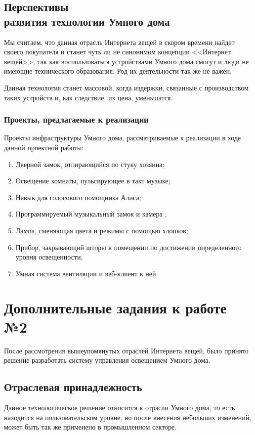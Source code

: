 \documentclass[a4paper,14pt]{extarticle}
\begin{document}
\fi
\subsection{Перспективы\\развития технологии Умного дома}
Мы считаем, что данная отрасль Интернета вещей в скором времени найдет своего покупателя и станет чуть ли не синонимом концепции <<Интернет вещей>>, так как воспользоваться устройствами Умного дома смогут и люди не имеющие технического образования. Род их деятельности так же не важен.

Данная технология станет массовой, когда издержки, связанные с производством таких устройств и, как следствие, их цена, уменьшатся.
\subsubsection*{Проекты, предлагаемые к реализации}
Проекты инфраструктуры Умного дома, рассматриваемые к реализации в ходе данной проектной работы:
\begin{enumerate}
	\item Дверной замок, отпирающийся по стуку хозяина;
	\item Освещение комнаты, пульсирующее в такт музыке;
	\item Навык для голосового помощника Алиса;
	\item Программируемый музыкальный замок и камера ;
	\item Лампа, сменяющая цвета и режимы с помощью хлопков;
	\item Прибор, закрывающий шторы в помещении по достижении определенного уровня освещенности;
	\item Умная система вентиляции и веб-клиент к ней.
\end{enumerate}
\newpage
\section{Дополнительные задания к работе №2}
После рассмотрения вышеупомянутых отраслей Интернета вещей, было принято решение разработать систему управления освещением Умного дома.

\subsection{Отраслевая принадлежность}
Данное технологическое решение относится к отрасли Умного дома, то есть находится на пользовательском уровне, но после внесения небольших изменений, может быть так же применено в промышленном секторе.
\end{document}
